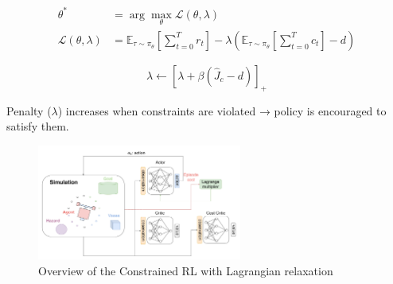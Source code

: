\documentclass[8pt, aspectratio=169]{beamer} %
\begin{document}
\begin{frame}{\insertsubsectionhead}

  \begin{equation}
    \begin{aligned}
      \theta^* &= \arg\max_\theta \mathcal{L}(\theta, \lambda) \\
      \mathcal{L}(\theta, \lambda) &= \mathbb{E}_{\tau \sim \pi_\theta} \left[ \sum^T_{t = 0} r_t \right] - \lambda \left( \mathbb{E}_{\tau \sim \pi_\theta} \left[ \sum^T_{t = 0} c_t \right] - d \right)
    \end{aligned}
  \end{equation}

  \vspace{0.5cm}

  \begin{equation}
    \lambda \leftarrow \left[ \lambda + \beta\left( \hat{J}_c - d \right) \right]_+
  \end{equation}

  \vspace{0.5cm}

  Penalty ($\lambda$) increases when constraints are violated → policy is encouraged to satisfy them.


\end{frame}


\begin{frame}{\insertsubsectionhead}
  \begin{figure}
    \includegraphics[width=0.6\textwidth]{figures/ppo-lag.pdf}
    \caption{Overview of the Constrained RL with Lagrangian relaxation}
  \end{figure}
\end{frame}
\end{document}

